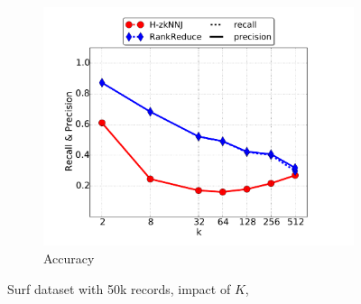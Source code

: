 \begin{figure}[h]
\begin{subfigure}[b]{0.3\textwidth}
        \end{subfigure}%
        \begin{subfigure}[b]{0.3\textwidth}
                 \includegraphics[width=\textwidth]{img-perf/surf/k/accuracy.pdf} 
                \caption{Accuracy\label{fig:surf_k_acc}}
                
        \end{subfigure}%
 \caption{Surf dataset with 50k records, impact of $K$,
  \label{fig:surf_impact_k}}
\end{figure}



